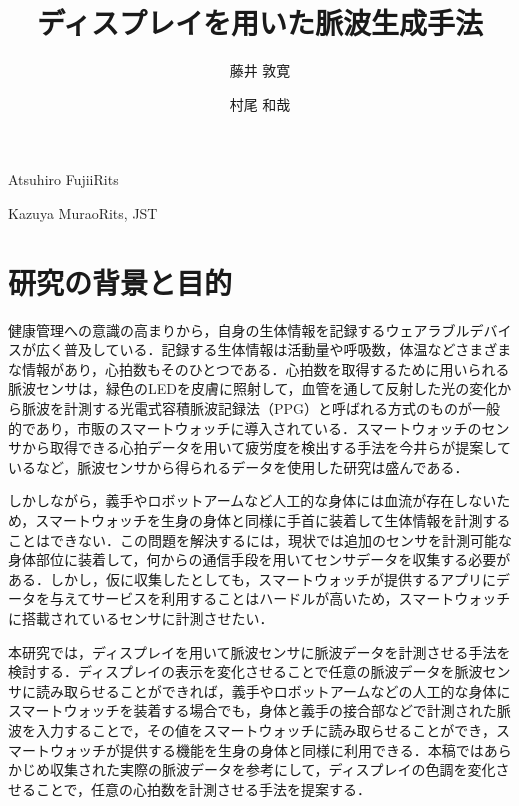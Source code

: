 \documentclass[Japanese,noauthor]{dicomopapers}
\begin{document}
\title{ディスプレイを用いた脈波生成手法}



\author{藤井 敦寛}{Atsuhiro Fujii}{Rits}
\author{村尾 和哉}{Kazuya Murao}{Rits, JST}

\maketitle

\section{研究の背景と目的}
健康管理への意識の高まりから，自身の生体情報を記録するウェアラブルデバイスが広く普及している．記録する生体情報は活動量や呼吸数，体温などさまざまな情報があり，心拍数もそのひとつである．心拍数を取得するために用いられる脈波センサは，緑色のLEDを皮膚に照射して，血管を通して反射した光の変化から脈波を計測する光電式容積脈波記録法（PPG）と呼ばれる方式のものが一般的であり，市販のスマートウォッチに導入されている．スマートウォッチのセンサから取得できる心拍データを用いて疲労度を検出する手法を今井ら\cite{fatigue_detection}が提案しているなど，脈波センサから得られるデータを使用した研究は盛んである．
\par

しかしながら，義手やロボットアームなど人工的な身体には血流が存在しないため，スマートウォッチを生身の身体と同様に手首に装着して生体情報を計測することはできない．この問題を解決するには，現状では追加のセンサを計測可能な身体部位に装着して，何からの通信手段を用いてセンサデータを収集する必要がある．しかし，仮に収集したとしても，スマートウォッチが提供するアプリにデータを与えてサービスを利用することはハードルが高いため，スマートウォッチに搭載されているセンサに計測させたい．
\par

本研究では，ディスプレイを用いて脈波センサに脈波データを計測させる手法を検討する．ディスプレイの表示を変化させることで任意の脈波データを脈波センサに読み取らせることができれば，義手やロボットアームなどの人工的な身体にスマートウォッチを装着する場合でも，身体と義手の接合部などで計測された脈波を入力することで，その値をスマートウォッチに読み取らせることができ，スマートウォッチが提供する機能を生身の身体と同様に利用できる．本稿ではあらかじめ収集された実際の脈波データを参考にして，ディスプレイの色調を変化させることで，任意の心拍数を計測させる手法を提案する．
\end{document}
